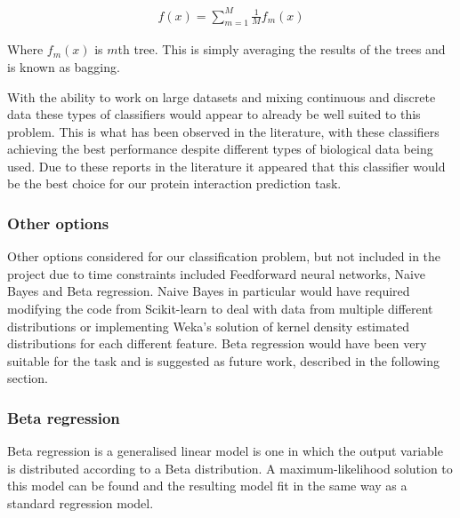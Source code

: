 \begin{align}
    f(x) = \sum_{m=1}^{M} \frac{1}{M} f_{m}(x)
\end{align}

Where $f_{m}(x)$ is $m$th tree. This is simply averaging the results of the trees and is known as bagging.

With the ability to work on large datasets and mixing continuous and discrete data these types of classifiers would appear to already be well suited to this problem.
This is what has been observed in the literature, with these classifiers achieving the best performance despite different types of biological data being used\autocites{qi_evaluation_2006,rodgers-melnick_predicting_2013}.
Due to these reports in the literature it appeared that this classifier would be the best choice for our protein interaction prediction task.


\subsubsection*{Other options}

Other options considered for our classification problem, but not included in the project due to time constraints included Feedforward neural networks, Naive Bayes and Beta regression.
Naive Bayes in particular would have required modifying the code from Scikit-learn to deal with data from multiple different distributions or implementing Weka's solution of kernel density estimated distributions for each different feature\autocite{john_estimating_1995}.
Beta regression would have been very suitable for the task and is suggested as future work, described in the following section.

\subsubsection*{Beta regression}

Beta regression is a generalised linear model is one in which the output variable is distributed according to a Beta distribution\autocite{smithson_better_2006}.
A maximum-likelihood solution to this model can be found and the resulting model fit in the same way as a standard regression model.

